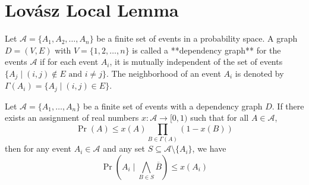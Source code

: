 \chapter{Lovász Local Lemma}

\begin{definition}
Let $\mathcal{A} = \{A_1, A_2, \ldots, A_n\}$ be a finite set of events in a probability space. A graph $D=(V,E)$ with $V=\{1, 2, \ldots, n\}$ is called a **dependency graph** for the events $\mathcal{A}$ if for each event $A_i$, it is mutually independent of the set of events $\{A_j \mid (i,j) \notin E \text{ and } i \neq j\}$. The neighborhood of an event $A_i$ is denoted by $\Gamma(A_i) = \{A_j \mid (i,j) \in E\}$.
\end{definition}

\begin{lemma}
Let $\mathcal{A} = \{A_1, \ldots, A_n\}$ be a finite set of events with a dependency graph $D$. If there exists an assignment of real numbers $x: \mathcal{A} \to [0, 1)$ such that for all $A \in \mathcal{A}$,
$$\Pr(A) \leq x(A) \prod_{B \in \Gamma(A)} (1 - x(B))$$
then for any event $A_i \in \mathcal{A}$ and any set $S \subseteq \mathcal{A} \setminus \{A_i\}$, we have
$$\Pr\left(A_i \mid \bigwedge_{B \in S} \overline{B}\right) \leq x(A_i)$$
\end{lemma}

